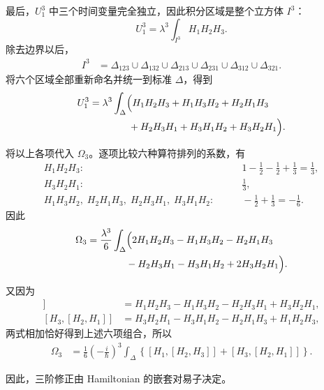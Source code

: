 \documentclass[UTF8,a4paper,11pt,openany]{ctexbook}
\begin{document}
\begin{itemize}
    最后，$U_1^3$ 中三个时间变量完全独立，因此积分区域是整个立方体
    $I^3$：
    \begin{equation}
        U_1^3
        =
        \lambda^3
        \int_{I^3}H_1H_2H_3.
    \end{equation}
    除去边界以后，
    \begin{align}
        I^3
        &=
        \Delta_{123}
        \cup\Delta_{132}
        \cup\Delta_{213}
        \cup\Delta_{231}
        \cup\Delta_{312}
        \cup\Delta_{321}.
    \end{align}
    将六个区域全部重新命名并统一到标准 $\Delta$，得到
    \begin{align}
        U_1^3
        &=
        \lambda^3
        \int_{\Delta}
        \Bigl(
            H_1H_2H_3
            +H_1H_3H_2
            +H_2H_1H_3
            \nonumber\\
        &\qquad\qquad
            +H_2H_3H_1
            +H_3H_1H_2
            +H_3H_2H_1
        \Bigr).
    \end{align}

    将以上各项代入 $\Omega_3$。逐项比较六种算符排列的系数，有
    \begin{align}
        H_1H_2H_3:
        &\qquad
        1-\frac12-\frac12+\frac13
        =
        \frac13,
        \nonumber\\
        H_3H_2H_1:
        &\qquad
        \frac13,
        \nonumber\\
        H_1H_3H_2,\;
        H_2H_1H_3,\;
        H_2H_3H_1,\;
        H_3H_1H_2:
        &\qquad
        -\frac12+\frac13
        =
        -\frac16.
    \end{align}
    因此
    \begin{align}
        \Omega_3
        &=
        \frac{\lambda^3}{6}
        \int_{\Delta}
        \Bigl(
            2H_1H_2H_3
            -H_1H_3H_2
            -H_2H_1H_3
            \nonumber\\
        &\qquad\qquad
            -H_2H_3H_1
            -H_3H_1H_2
            +2H_3H_2H_1
        \Bigr).
    \end{align}

    又因为
    \begin{align}
        [H_1,[H_2,H_3]]
        &=
        H_1H_2H_3
        -H_1H_3H_2
        -H_2H_3H_1
        +H_3H_2H_1,
        \nonumber\\
        [H_3,[H_2,H_1]]
        &=
        H_3H_2H_1
        -H_3H_1H_2
        -H_2H_1H_3
        +H_1H_2H_3,
    \end{align}
    两式相加恰好得到上述六项组合，所以
    \begin{align}
        \Omega_3
        &=
        \frac16
        \left(-\frac{i}{\hbar}\right)^3
        \int_{\Delta}
        \left\{
            [H_1,[H_2,H_3]]
            +
            [H_3,[H_2,H_1]]
        \right\}.
    \end{align}

    因此，三阶修正由 Hamiltonian 的嵌套对易子决定。
\end{itemize}
\end{document}
